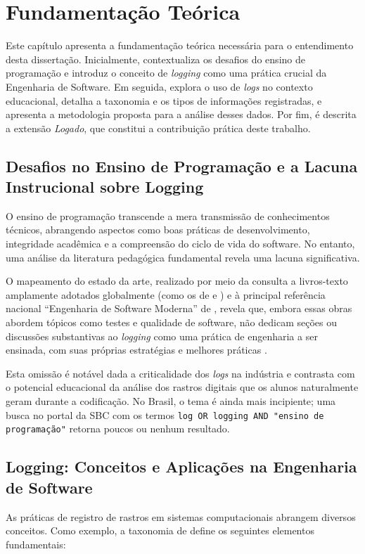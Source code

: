 \chapter{Fundamentação Teórica}
\label{cap:fundamentacao}

Este capítulo apresenta a fundamentação teórica necessária para o entendimento desta dissertação. Inicialmente, contextualiza os desafios do ensino de programação e introduz o conceito de \textit{logging} como uma prática crucial da Engenharia de Software. Em seguida, explora o uso de \textit{logs} no contexto educacional, detalha a taxonomia e os tipos de informações registradas, e apresenta a metodologia proposta para a análise desses dados. Por fim, é descrita a extensão \textit{Logado}, que constitui a contribuição prática deste trabalho.

\section{Desafios no Ensino de Programação e a Lacuna Instrucional sobre Logging}
\label{sec:desafios-lacuna}

O ensino de programação transcende a mera transmissão de conhecimentos técnicos, abrangendo aspectos como boas práticas de desenvolvimento, integridade acadêmica e a compreensão do ciclo de vida do software. No entanto, uma análise da literatura pedagógica fundamental revela uma lacuna significativa.

O mapeamento do estado da arte, realizado por meio da consulta a livros-texto amplamente adotados globalmente (como os de \citeauthor{sommerville2011} e \citeauthor{pressman2014}) e à principal referência nacional ``Engenharia de Software Moderna'' de \citeauthor{valente2020}, revela que, embora essas obras abordem tópicos como testes e qualidade de software, não dedicam seções ou discussões substantivas ao \textit{logging} como uma prática de engenharia a ser ensinada, com suas próprias estratégias e melhores práticas \cite{gu2022logging}.

Esta omissão é notável dada a criticalidade dos \textit{logs} na indústria e contrasta com o potencial educacional da análise dos rastros digitais que os alunos naturalmente geram durante a codificação. No Brasil, o tema é ainda mais incipiente; uma busca no portal da SBC com os termos \texttt{log OR logging AND "ensino de programação"} retorna poucos ou nenhum resultado.

\section{Logging: Conceitos e Aplicações na Engenharia de Software}
\label{sec:conceitos-logging}
As práticas de registro de rastros em sistemas computacionais abrangem diversos conceitos. Como exemplo, a taxonomia de \cite{gu2022logging} define os seguintes elementos fundamentais:

